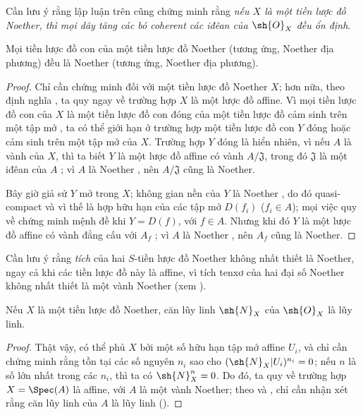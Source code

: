 \documentclass[oneside]{amsart}
\newcommand{\oldpage}[2][]{{\marginnote{\normalfont\textbf{#1}~|~#2}}\ignorespaces}
\let\EGAOriginalLabel\label
\renewcommand{\label}[1]{\phantomsection\EGAOriginalLabel{#1}}
\begin{document}
Cần lưu ý rằng lập luận trên cũng chứng minh rằng \emph{nếu $X$ là một tiền
lược đồ Noether, thì mọi dãy tăng các bó coherent các iđêan của $\sh{O}_X$
đều ổn định}.

\begin{proposition}[6.1.4]
\label{I.6.1.4}
Mọi tiền lược đồ con của một tiền lược đồ Noether (tương ứng, Noether địa
phương) đều là Noether (tương ứng, Noether địa phương).
\end{proposition}

\begin{proof}
Chỉ cần chứng minh đối với một tiền lược đồ Noether $X$; hơn nữa, theo định
nghĩa , ta quy ngay về trường hợp $X$ là một lược đồ affine.
Vì mọi tiền lược đồ con của $X$ là một tiền lược đồ con đóng của một tiền
lược đồ cảm sinh trên một tập mở , ta có thể giới hạn ở trường
hợp một tiền lược đồ con $Y$ đóng hoặc cảm sinh trên một tập mở của $X$.
Trường hợp $Y$ đóng là hiển nhiên, vì nếu $A$ là vành của $X$, thì ta biết
$Y$ là một lược đồ affine có vành $A/\mathfrak{J}$, trong đó
$\mathfrak{J}$ là một iđêan của $A$ ; vì $A$ là Noether
, nên $A/\mathfrak{J}$ cũng là Noether.

Bây giờ giả sử $Y$ mở trong $X$; không gian nền của $Y$ là Noether
, do đó quasi-compact và vì thế là hợp hữu hạn của các tập mở
$D(f_i)$ ($f_i\in A$);
\oldpage[I]{142}
mọi việc quy về chứng minh mệnh đề khi $Y=D(f)$, với $f\in A$. Nhưng khi đó
$Y$ là một lược đồ affine có vành đẳng cấu với $A_f$ ; vì
$A$ là Noether , nên $A_f$ cũng là Noether.
\end{proof}

\begin{env}[6.1.5]
\label{I.6.1.5}
Cần lưu ý rằng \emph{tích} của hai $S$-tiền lược đồ Noether không nhất thiết
là Noether, ngay cả khi các tiền lược đồ này là affine, vì tích tenxơ của hai
đại số Noether không nhất thiết là một vành Noether (xem ).
\end{env}

\begin{proposition}[6.1.6]
\label{I.6.1.6}
Nếu $X$ là một tiền lược đồ Noether, căn lũy linh $\sh{N}_X$ của
$\sh{O}_X$ là lũy linh.
\end{proposition}

\begin{proof}
Thật vậy, có thể phủ $X$ bởi một số hữu hạn tập mở affine $U_i$, và chỉ cần
chứng minh rằng tồn tại các số nguyên $n_i$ sao cho
$(\sh{N}_X|U_i)^{n_i}=0$; nếu $n$ là số lớn nhất trong các $n_i$, thì ta có
$\sh{N}_X^n=0$. Do đó, ta quy về trường hợp $X=\Spec(A)$ là affine, với $A$
là một vành Noether; theo  và , chỉ cần nhận
xét rằng căn lũy linh của $A$ là lũy linh
(\cite[p.~127, cor.~4]{I-11}).
\end{proof}
\end{document}
